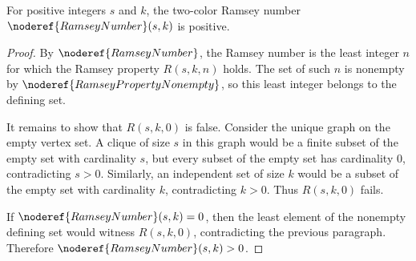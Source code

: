 \begin{helper}
For positive integers \(s\) and \(k\), the two-color Ramsey number
\(\noderef{RamseyNumber}(s,k)\) is positive.
\end{helper}
\begin{proof}
By \(\noderef{RamseyNumber}\), the Ramsey number is the least integer \(n\)
for which the Ramsey property \(R(s,k,n)\) holds.  The set of such \(n\) is
nonempty by \(\noderef{RamseyPropertyNonempty}\), so this least integer belongs
to the defining set.

It remains to show that \(R(s,k,0)\) is false.  Consider the unique graph on
the empty vertex set.  A clique of size \(s\) in this graph would be a finite
subset of the empty set with cardinality \(s\), but every subset of the empty
set has cardinality \(0\), contradicting \(s>0\).  Similarly, an independent
set of size \(k\) would be a subset of the empty set with cardinality \(k\),
contradicting \(k>0\).  Thus \(R(s,k,0)\) fails.

If \(\noderef{RamseyNumber}(s,k)=0\), then the least element of the nonempty
defining set would witness \(R(s,k,0)\), contradicting the previous paragraph.
Therefore \(\noderef{RamseyNumber}(s,k)>0\).
\end{proof}
